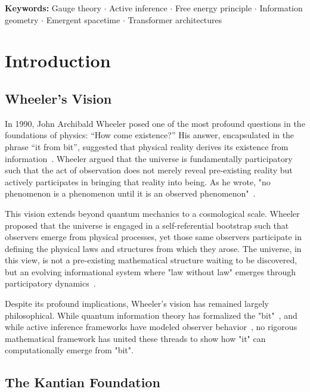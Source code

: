 \documentclass[11pt]{article}
\begin{document}
\noindent\textbf{Keywords:} Gauge theory $\cdot$ Active inference $\cdot$ Free energy principle $\cdot$ Information geometry $\cdot$ Emergent spacetime $\cdot$ Transformer architectures


\maketitle

\section{Introduction}

\subsection{Wheeler's Vision}

In 1990, John Archibald Wheeler posed one of the most profound questions in the foundations of physics: ``How come existence?'' His answer, encapsulated in the phrase ``it from bit'', suggested that physical reality derives its existence from information~\cite{Wheeler1990}. Wheeler argued that the universe is fundamentally participatory such that the act of observation does not merely reveal pre-existing reality but actively participates in bringing that reality into being. As he wrote, "no phenomenon is a phenomenon until it is an observed phenomenon"~\cite{Wheeler1983}.

This vision extends beyond quantum mechanics to a cosmological scale. Wheeler proposed that the universe is engaged in a self-referential bootstrap such that observers emerge from physical processes, yet those same observers participate in defining the physical laws and structures from which they arose. The universe, in this view, is not a pre-existing mathematical structure waiting to be discovered, but an evolving informational system where "law without law" emerges through participatory dynamics~\cite{Wheeler1983}.

Despite its profound implications, Wheeler's vision has remained largely philosophical. While quantum information theory has formalized the "bit"~\cite{Shannon1948,CoverThomas2006}, and while active inference frameworks have modeled observer behavior~\cite{Friston2010,Friston2017}, no rigorous mathematical framework has united these threads to show how "it" can computationally emerge from "bit".

\subsection{The Kantian Foundation}
\end{document}
